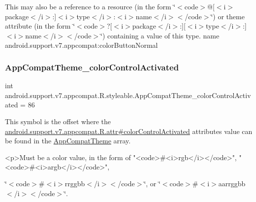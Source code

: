This may also be a reference to a resource (in the form \char`\"{}$<$code$>$@\mbox{[}$<$i$>$package$<$/i$>$\+:\mbox{]}$<$i$>$type$<$/i$>$\+:$<$i$>$name$<$/i$>$$<$/code$>$\char`\"{}) or theme attribute (in the form \char`\"{}$<$code$>$?\mbox{[}$<$i$>$package$<$/i$>$\+:\mbox{]}\mbox{[}$<$i$>$type$<$/i$>$\+:\mbox{]}$<$i$>$name$<$/i$>$$<$/code$>$\char`\"{}) containing a value of this type.  name android.\+support.\+v7.\+appcompat\+:color\+Button\+Normal \mbox{\label{classandroid_1_1support_1_1v7_1_1appcompat_1_1R_1_1styleable_a9111aa1922570418c642eb40adbae88e}} 
\subsubsection{\texorpdfstring{App\+Compat\+Theme\+\_\+color\+Control\+Activated}{AppCompatTheme\_colorControlActivated}}
{\footnotesize\ttfamily int android.\+support.\+v7.\+appcompat.\+R.\+styleable.\+App\+Compat\+Theme\+\_\+color\+Control\+Activated = 86\hspace{0.3cm}{\ttfamily [static]}}

This symbol is the offset where the \hyperlink{classandroid_1_1support_1_1v7_1_1appcompat_1_1R_1_1attr_a11bce689ca9ed11c9c96757895cebcff}{android.\+support.\+v7.\+appcompat.\+R.\+attr\#color\+Control\+Activated} attribute\textquotesingle{}s value can be found in the \hyperlink{classandroid_1_1support_1_1v7_1_1appcompat_1_1R_1_1styleable_a5c42f89e8a410c323be34208d75c430b}{App\+Compat\+Theme} array.

\begin{DoxyVerb}      <p>Must be a color value, in the form of "<code>#<i>rgb</i></code>", "<code>#<i>argb</i></code>",
\end{DoxyVerb}
 \char`\"{}$<$code$>$\#$<$i$>$rrggbb$<$/i$>$$<$/code$>$\char`\"{}, or \char`\"{}$<$code$>$\#$<$i$>$aarrggbb$<$/i$>$$<$/code$>$\char`\"{}. 

